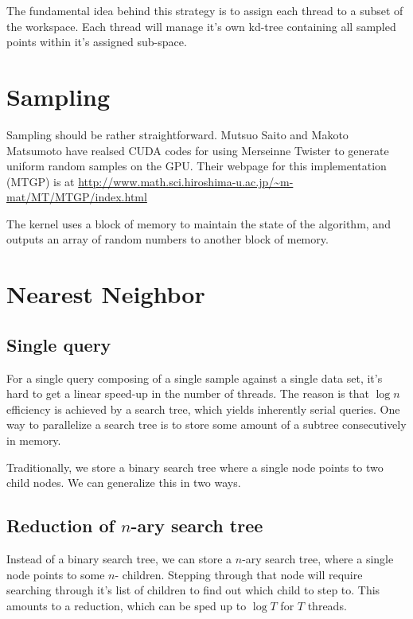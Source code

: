 
\maketitle

The fundamental idea behind this strategy is to assign each thread to a subset of the workspace. Each thread will manage it's own kd-tree containing all sampled points within it's assigned sub-space. 

\begin{figure}[H]
\begin{centering}
    \texttt{[image: \\figfile\{fig/thread\_kdtree]}}
    \caption{Division Strategy}
\end{centering}
\end{figure}

\section{Sampling}

Sampling should be rather straightforward. Mutsuo Saito and Makoto Matsumoto have realsed CUDA codes for using Merseinne Twister to generate uniform random samples on the GPU. Their webpage for this implementation (MTGP) is at \url{http://www.math.sci.hiroshima-u.ac.jp/~m-mat/MT/MTGP/index.html}

The kernel uses a block of memory to maintain the state of the algorithm, and outputs an array of random numbers to another block of memory. 

\section{Nearest Neighbor}


\subsection{Single query}
For a single query composing of a single sample against a single data set, it's hard to get a linear speed-up in the number of threads. The reason is that $\log n$ efficiency is achieved by a search tree, which yields inherently serial queries. One way to parallelize a search tree is to store some amount of a subtree consecutively in memory. 

Traditionally, we store a binary search tree where a single node points to two child nodes. We can generalize this in two ways. 

\subsection{Reduction of $n$-ary search tree}
Instead of a binary search tree, we can store a $n$-ary search tree, where a single node points to some $n$- children. Stepping through that node will require searching through it's list of children to find out which child to step to. This amounts to a reduction, which can be sped up to $\log T$ for $T$ threads. 

